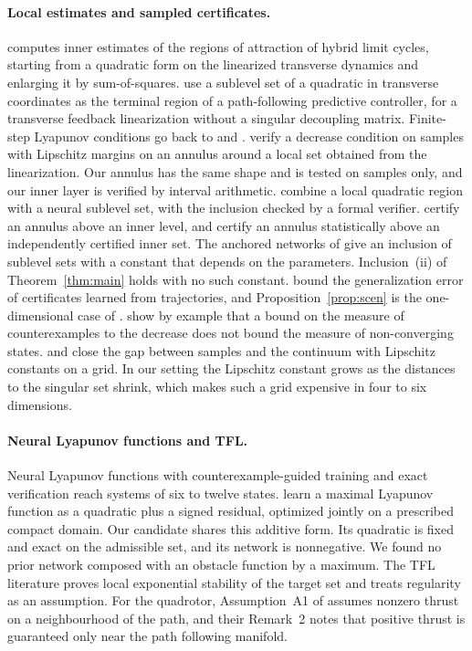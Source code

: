 \paragraph{Local estimates and sampled certificates.} \citet{manchester2011} computes inner estimates of the regions of attraction of hybrid limit cycles, starting from a quadratic form on the linearized transverse dynamics and enlarging it by sum-of-squares. \citet{faulwasser2016} use a sublevel set of a quadratic in transverse coordinates as the terminal region of a path-following predictive controller, for a transverse feedback linearization without a singular decoupling matrix. Finite-step Lyapunov conditions go back to \citet{aeyels1998} and \citet{geiselhart2014}. \citet{bobiti2018} verify a decrease condition on samples with Lipschitz margins on an annulus around a local set obtained from the linearization. Our annulus has the same shape and is tested on samples only, and our inner layer is verified by interval arithmetic. \citet{liu2025} combine a local quadratic region with a neural sublevel set, with the inclusion checked by a formal verifier. \citet{li2025} certify an annulus above an inner level, and \citet{score2026} certify an annulus statistically above an independently certified inner set. The anchored networks of \citet{liu2026anchored} give an inclusion of sublevel sets with a constant that depends on the parameters. Inclusion~(ii) of Theorem~\ref{thm:main} holds with no such constant. \citet{boffi2020} bound the generalization error of certificates learned from trajectories, and Proposition~\ref{prop:scen} is the one-dimensional case of \citet{campi2008}. \citet{kenanian2019} show by example that a bound on the measure of counterexamples to the decrease does not bound the measure of non-converging states. \citet{berkenkamp2016} and \citet{richards2018} close the gap between samples and the continuum with Lipschitz constants on a grid. In our setting the Lipschitz constant grows as the distances to the singular set shrink, which makes such a grid expensive in four to six dimensions.

\paragraph{Neural Lyapunov functions and TFL.} Neural Lyapunov functions with counterexample-guided training and exact verification \citep{chang2019,abate2021,dai2021,wu2023,yang2024} reach systems of six to twelve states. \citet{barreau2024} learn a maximal Lyapunov function as a quadratic plus a signed residual, optimized jointly on a prescribed compact domain. Our candidate shares this additive form. Its quadratic is fixed and exact on the admissible set, and its network is nonnegative. We found no prior network composed with an obstacle function by a maximum. The TFL literature \citep{nielsen2006,nielsen2008,akhtar2011,akhtar2015,akhtar2012,allawati2026} proves local exponential stability of the target set and treats regularity as an assumption. For the quadrotor, Assumption~A1 of \citet{allawati2026} assumes nonzero thrust on a neighbourhood of the path, and their Remark~2 notes that positive thrust is guaranteed only near the path following manifold.

